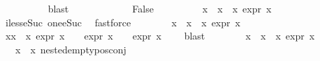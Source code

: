\begin{isabellebody}
\ \ \ \ \ \ \ \ \isamarkupfalse%
\ blast\isanewline
\ \ \ \ \isamarkupfalse%
\isanewline
\ \ \ \ \ \ \isamarkupfalse%
\ False\isanewline
\ \ \ \ \ \ \isamarkupfalse%
\ \isamarkupfalse%
\ {\isachardoublequoteopen}{\isasymforall}x\ {\isasymin}\ {\isacharparenleft}{\kern0pt}x{}{}\ {\isacharbackquote}{\kern0pt}\ x{}{}{\isacharparenright}{\kern0pt}{\isachardot}{\kern0pt}\ expr{\isacharunderscore}{\kern0pt}{}\ x\ {\isasymle}\ {}{\isachardoublequoteclose}\isanewline
\ \ \ \ \ \ \ \ \isamarkupfalse%
\ iless{\isacharunderscore}{\kern0pt}eSuc{}\ one{\isacharunderscore}{\kern0pt}eSuc\ \isamarkupfalse%
\ fastforce\isanewline
\ \ \ \ \ \ \isamarkupfalse%
\ {\isachardoublequoteopen}{\isasymforall}x\ {\isasymin}\ {\isacharparenleft}{\kern0pt}x{}{}\ {\isacharbackquote}{\kern0pt}\ x{}{}{\isacharparenright}{\kern0pt}{\isachardot}{\kern0pt}\ expr{\isacharunderscore}{\kern0pt}{}\ x\ {\isasymle}\ {}{\isachardoublequoteclose}\isanewline
\ \ \ \ \ \ \ \ \isamarkupfalse%
\ {\isacartoucheopen}{\isasymforall}x{\isasymin}x{}{}\ {\isacharbackquote}{\kern0pt}\ x{}{}{\isachardot}{\kern0pt}\ expr{\isacharunderscore}{\kern0pt}{}\ x\ {\isasymle}\ {}\ {\isasymand}\ expr{\isacharunderscore}{\kern0pt}{}\ x\ {\isasymle}\ {}\ {\isasymand}\ expr{\isacharunderscore}{\kern0pt}{}\ x\ {\isasymle}\ {}{\isacartoucheclose}\ \isamarkupfalse%
\ blast\isanewline
\ \ \ \ \ \ \isamarkupfalse%
\ {\isacartoucheopen}{\isasymforall}x\ {\isasymin}\ {\isacharparenleft}{\kern0pt}x{}{}\ {\isacharbackquote}{\kern0pt}\ x{}{}{\isacharparenright}{\kern0pt}{\isachardot}{\kern0pt}\ expr{\isacharunderscore}{\kern0pt}{}\ x\ {\isasymle}\ {}{\isacartoucheclose}\ \isamarkupfalse%
\ {\isachardoublequoteopen}{\isacharparenleft}{\kern0pt}{\isasymforall}{\isasympsi}\ {\isasymin}\ {\isacharparenleft}{\kern0pt}x{}{}\ {\isacharbackquote}{\kern0pt}\ x{}{}{\isacharparenright}{\kern0pt}{\isachardot}{\kern0pt}\ nested{\isacharunderscore}{\kern0pt}empty{\isacharunderscore}{\kern0pt}pos{\isacharunderscore}{\kern0pt}conj\ {\isasympsi}{\isacharparenright}{\kern0pt}{\isachardoublequoteclose}\isanewline

\end{isabellebody}

